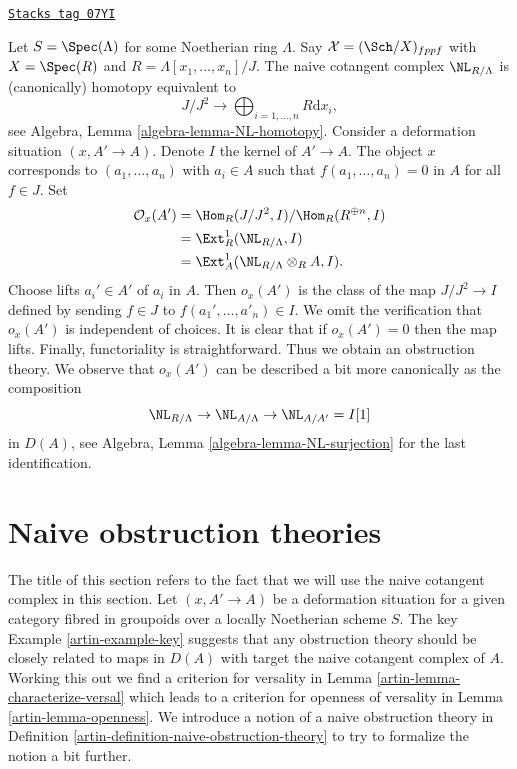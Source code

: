 \begin{example}

\label{artin-example-key}
\href{https://stacks.math.columbia.edu/tag/07YI}{\texttt{Stacks tag 07YI}}

Let $S = \Spec(\Lambda)$ for some Noetherian ring $\Lambda$.
Say $\mathcal{X} = (\Sch/X)_{fppf}$ with $X = \Spec(R)$ and
$R = \Lambda[x_1, \ldots, x_n]/J$. The naive cotangent
complex $\NL_{R/\Lambda}$ is (canonically) homotopy equivalent to
$$
J/J^2
\longrightarrow
\bigoplus\nolimits_{i = 1, \ldots, n} R\text{d}x_i,
$$
see Algebra, Lemma \ref{algebra-lemma-NL-homotopy}.
Consider a deformation situation $(x, A' \to A)$. Denote $I$ the kernel of
$A' \to A$. The object $x$ corresponds to $(a_1, \ldots, a_n)$
with $a_i \in A$ such that $f(a_1, \ldots, a_n) = 0$ in $A$ for all $f \in J$.
Set
\begin{align*}
\mathcal{O}_x(A')
& =
\Hom_R(J/J^2, I)/\Hom_R(R^{\oplus n}, I) \\
& =
\Ext^1_R(\NL_{R/\Lambda}, I) \\
& =
\Ext^1_A(\NL_{R/\Lambda} \otimes_R A, I).
\end{align*}
Choose lifts $a_i' \in A'$ of $a_i$ in $A$. Then $o_x(A')$
is the class of the map $J/J^2 \to I$ defined by sending $f \in J$ to
$f(a_1', \ldots, a'_n) \in I$. We omit the verification that
$o_x(A')$ is independent of choices. It is clear that if $o_x(A') = 0$
then the map lifts. Finally, functoriality is straightforward.
Thus we obtain an obstruction theory. We observe that $o_x(A')$
can be described a bit more canonically as the composition
$$
\NL_{R/\Lambda} \to \NL_{A/\Lambda} \to \NL_{A/A'} = I[1]
$$
in $D(A)$, see Algebra, Lemma \ref{algebra-lemma-NL-surjection}
for the last identification.
\end{example}

\section{Naive obstruction theories}
\label{artin-section-naive-obstruction-theory}
The title of this section refers to the fact that we will use the
naive cotangent complex in this section. Let $(x, A' \to A)$
be a deformation situation for a given category fibred in groupoids over a
locally Noetherian scheme $S$. The key Example \ref{artin-example-key}
suggests that any obstruction theory should be closely related to
maps in $D(A)$ with target the naive cotangent complex of $A$.
Working this out we find a criterion for versality in
Lemma \ref{artin-lemma-characterize-versal} which leads to a criterion for
openness of versality in Lemma \ref{artin-lemma-openness}. We introduce a notion of
a naive obstruction theory in
Definition \ref{artin-definition-naive-obstruction-theory} to try to formalize
the notion a bit further.

